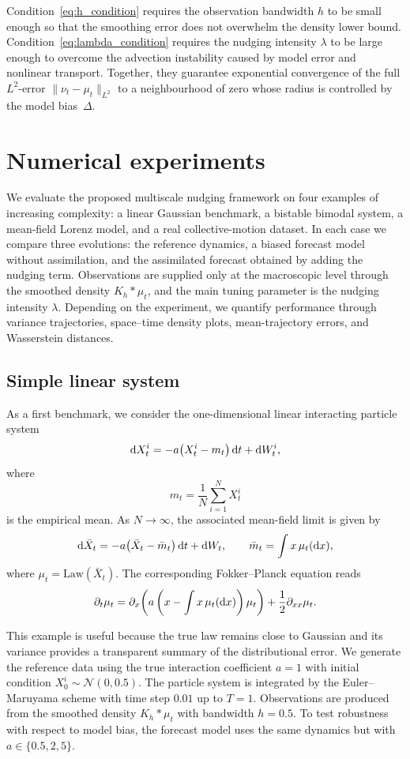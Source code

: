Condition~\eqref{eq:h_condition} requires the observation bandwidth $h$ to be small enough so that the smoothing error does not overwhelm the density lower bound. Condition~\eqref{eq:lambda_condition} requires the nudging intensity $\lambda$ to be large enough to overcome the advection instability caused by model error and nonlinear transport. Together, they guarantee exponential convergence of the full $L^2$-error $\|\nu_t-\mu_t\|_{L^2}$ to a neighbourhood of zero whose radius is controlled by the model bias~$\Delta$.
 
 
\section{Numerical experiments}

We evaluate the proposed multiscale nudging framework on four examples of increasing complexity: a linear Gaussian benchmark, a bistable bimodal system, a mean-field Lorenz model, and a real collective-motion dataset. In each case we compare three evolutions: the reference dynamics, a biased forecast model without assimilation, and the assimilated forecast obtained by adding the nudging term. Observations are supplied only at the macroscopic level through the smoothed density $K_h * \mu_t$, and the main tuning parameter is the nudging intensity $\lambda$. Depending on the experiment, we quantify performance through variance trajectories, space--time density plots, mean-trajectory errors, and Wasserstein distances.

\subsection{Simple linear system}

As a first benchmark, we consider the one-dimensional linear interacting particle system
\begin{equation}
    \mathrm{d} X_t^i = -a\bigl(X_t^i - m_t\bigr)\,\mathrm{d} t + \mathrm{d} W_t^i,
\end{equation}
where
\[
m_t = \frac{1}{N}\sum_{i=1}^N X_t^i
\]
is the empirical mean. As \(N \to \infty\), the associated mean-field limit is given by
\[
\mathrm{d} \bar X_t = -a\bigl(\bar X_t - \bar m_t\bigr)\,\mathrm{d} t + \mathrm{d} W_t,
\qquad
\bar m_t = \int x\,\mu_t(\mathrm{d} x),
\]
where \(\mu_t = \mathrm{Law}(\bar X_t)\). The corresponding Fokker--Planck equation reads
\[
\partial_t \mu_t
= \partial_x\!\left(a\left(x-\int x\,\mu_t(\mathrm{d} x)\right)\mu_t\right)
+ \frac{1}{2}\partial_{xx}\mu_t.
\]

This example is useful because the true law remains close to Gaussian and its variance provides a transparent summary of the distributional error. We generate the reference data using the true interaction coefficient \(a=1\) with initial condition \(X_0^i \sim \mathcal{N}(0,0.5)\). The particle system is integrated by the Euler--Maruyama scheme with time step \(0.01\) up to \(T=1\). Observations are produced from the smoothed density \(K_h * \mu_t\) with bandwidth \(h=0.5\). To test robustness with respect to model bias, the forecast model uses the same dynamics but with \(a \in \{0.5,2,5\}\).

